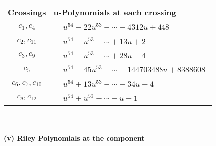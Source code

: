 \documentclass[1p]{elsarticle_modified}
\theoremstyle{definition}
\begin{document}
\begin{tabular}{m{50pt}|m{274pt}}
Crossings & \hspace{64pt}u-Polynomials at each crossing \\
\hline $$\begin{aligned}c_{1},c_{4}\end{aligned}$$&$\begin{aligned}
&u^{54}-22 u^{53}+\cdots-4312 u+448
\end{aligned}$\\
\hline $$\begin{aligned}c_{2},c_{11}\end{aligned}$$&$\begin{aligned}
&u^{54}- u^{53}+\cdots+13 u+2
\end{aligned}$\\
\hline $$\begin{aligned}c_{3},c_{9}\end{aligned}$$&$\begin{aligned}
&u^{54}- u^{53}+\cdots+28 u-4
\end{aligned}$\\
\hline $$\begin{aligned}c_{5}\end{aligned}$$&$\begin{aligned}
&u^{54}-45 u^{53}+\cdots-144703488 u+8388608
\end{aligned}$\\
\hline $$\begin{aligned}c_{6},c_{7},c_{10}\end{aligned}$$&$\begin{aligned}
&u^{54}+13 u^{53}+\cdots-34 u-4
\end{aligned}$\\
\hline $$\begin{aligned}c_{8},c_{12}\end{aligned}$$&$\begin{aligned}
&u^{54}+u^{53}+\cdots- u-1
\end{aligned}$\\
\hline
\end{tabular}\\~\\
\newpage\renewcommand{\arraystretch}{1}
\flushleft \textbf{(v) Riley Polynomials at the component}\newline \\
\end{document}
